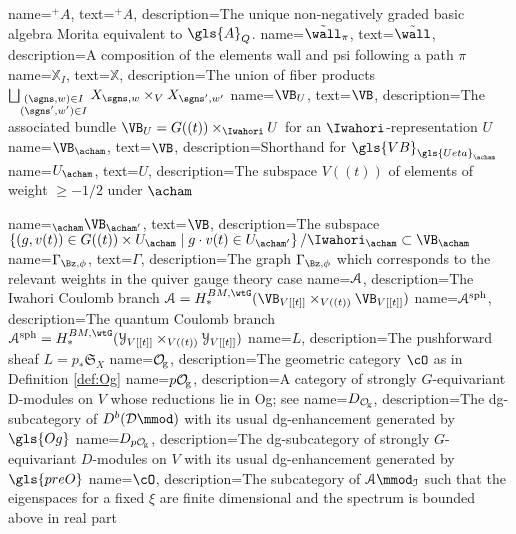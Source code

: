   {
   name={\ensuremath{ {}^+A}},
        text={\ensuremath{ {}^+A}},
   description={The unique non-negatively graded basic algebra Morita equivalent to $\gls{A}_Q$.}
 }
  {
   name={\ensuremath{\tilde{\wall}_\pi}},
        text={\ensuremath{\tilde{\wall}}},
   description={A composition of the elements \gls{wall} and \gls{psi}
   following a path $\pi$}
}
 {
   name={\ensuremath{\mathbb{X}_I}},
        text={\ensuremath{\mathbb{X}}},
   description={The union of fiber products $\bigsqcup_{\substack{(\sgns,w)\in I\\
(\sgns',w')\in I}}  X_{\sgns,w}\times_V X_{\sgns',w'}$}
}
 {
   name={\ensuremath{\VB_U}},
        text={\ensuremath{\VB}},
   description={The associated bundle $\VB_U=G((t))\times_{\Iwahori}
       U$ for an $\Iwahori$-representation $U$ }
}
 {
   name={\ensuremath{\VB_\acham}},
        text={\ensuremath{\VB}},
   description={Shorthand for $\gls{VB}_{\gls{Ueta}_\acham}$ }
}
 {
   name={\ensuremath{U_\acham}},
        text={\ensuremath{U}},
   description={The subspace $V((t))$ of elements of 
weight $\geq -1/2$ under $\acham$}
}

 {
   name={\ensuremath{{}_{\acham}\VB_{\acham'}}},
        text={\ensuremath{\VB}},
   description={The subspace $\left\{(g,v(t))\in G((t))\times
        U_{\acham}\mid g\cdot v(t)\in
        U_{\acham'}\right\}/\Iwahori_{\acham}\subset \VB_{\acham}$ }
}
 {
   name={\ensuremath{\Gamma_{\Bz,\phi}}},
        text={\ensuremath{\Gamma}},
   description={The graph $\Gamma_{\Bz,\phi}$ which corresponds to the
       relevant weights in the quiver gauge theory case}
}
  {
       name={\ensuremath{\EuScript{A}}},
       description={The Iwahori Coulomb branch $\EuScript{A}=H_*^{BM, \wtG}(\VB_{V[[t]]}\times_{V((t))}\VB_{V[[t]]})$}
 }
   {
       name={\ensuremath{\EuScript{A}^{\operatorname{sph}}}},
       description={The quantum Coulomb branch $\EuScript{A}^{\operatorname{sph}}=H_*^{BM, \wtG}(\EuScript{Y}_{V[[t]]}\times_{V((t))}\EuScript{Y}_{V[[t]]})$}
 }
   {
       name={\ensuremath{L}},
       description={The pushforward sheaf $L=p_*\mathfrak{S}_X$}
 }
   {
       name={\ensuremath{\cOg}},
       description={The geometric category $\cO$ as in Definition \ref{def:Og}}
 }
   {
       name={\ensuremath{\preO}},
       description={A category of strongly $G$-equivariant D-modules on $V$ whose reductions lie in \gls{Og}; see \cite[2.8]{Webqui}}
 }
    {
       name={\ensuremath{D_{\cOg}}},
       description={The dg-subcategory of $D^b(\mathcal{D}\mmod)$ with its usual dg-enhancement generated by $\gls{Og}$}
 }
   {
       name={\ensuremath{D_{\preO}}},
       description={The dg-subcategory of strongly $G$-equivariant $D$-modules on $V$ with its usual dg-enhancement generated by $\gls{preO}$}
 }
     {
       name={\ensuremath{\cO}},
       description={The subcategory of $\EuScript{A}\mmod_{\EuScript{I}}$ such that the eigenspaces for a fixed $\xi$ are
finite dimensional and the spectrum is bounded above in real part }}

